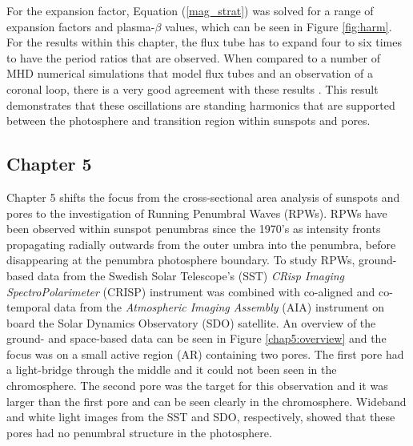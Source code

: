 	For the expansion factor, Equation (\ref{mag_strat}) was solved for a range of expansion factors and plasma-$\beta$ values, which can be seen in Figure \ref{fig:harm}.
	For the results within this chapter, the flux tube has to expand four to six times to have the period ratios that are observed.
	When compared to a number of MHD numerical simulations that model flux tubes and an observation of a coronal loop, there is a very good agreement with these results \citep{khomenko,fedun2,fedun1,2008A&A...489L..57K}.
	This result demonstrates that these oscillations are standing harmonics that are supported between the photosphere and transition region within sunspots and pores.

	\subsection{Chapter 5}
    
    Chapter 5 shifts the focus from the cross-sectional area analysis of sunspots and pores to the investigation of Running Penumbral Waves (RPWs).
    RPWs have been observed within sunspot penumbras since the 1970's as intensity fronts propagating radially outwards from the outer umbra into the penumbra, before disappearing at the penumbra photosphere boundary.
    To study RPWs, ground-based data from the Swedish Solar Telescope's (SST) \textit{CRisp Imaging SpectroPolarimeter} (CRISP) instrument was combined with co-aligned and co-temporal data from the \textit{Atmospheric Imaging Assembly} (AIA) instrument on board the Solar Dynamics Observatory (SDO) satellite.
    An overview of the ground- and space-based data can be seen in Figure \ref{chap5:overview} and the focus was on a small active region (AR) containing two pores.
    The first pore had a light-bridge through the middle and it could not been seen in the chromosphere.
    The second pore was the target for this observation and it was larger than the first pore and can be seen clearly in the chromosphere. 
    Wideband and white light images from the SST and SDO, respectively, showed that these pores had no penumbral structure in the photosphere.
    
